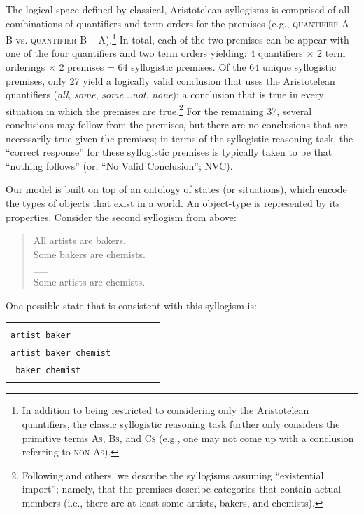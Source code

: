 \documentclass[floatsintext, doc]{apa6}
\newcommand{\mht}[1]{{\textcolor{Blue}{[mht: #1]}}}
\begin{document}
The logical space defined by classical, Aristotelean syllogisms is comprised of all combinations of quantifiers and term orders for the premises (e.g., \textsc{quantifier} \textsc{A} -- \textsc{B} vs. \textsc{quantifier} \textsc{B} -- \textsc{A}).\footnote{In addition to being restricted to considering only the Aristotelean quantifiers, the classic syllogistic reasoning task further only considers the primitive terms \textsc{As}, \textsc{Bs}, and \textsc{Cs} (e.g., one may not come up with a conclusion referring to \textsc{non-As}).}
In total, each of the two premises can be appear with one of the four quantifiers and two term orders yielding:  $4$ quantifiers  $\times$ 2 term orderings $\times$ 2 premises = 64 syllogistic premises.
Of the 64 unique syllogistic premises, only 27 yield a logically valid conclusion that uses the Aristotelean quantifiers (\emph{all}, \emph{some}, \emph{some...not}, \emph{none}): a conclusion that is true in every situation in which the premises are true.\footnote{Following  and others, we describe the syllogisms assuming ``existential import''; namely, that the premises describe categories that contain actual members (i.e., there are at least some artists, bakers, and chemists).}
For the remaining 37, several conclusions may follow from the premises, but there are no conclusions that are necessarily true given the premises; in terms of the syllogistic reasoning task, the ``correct response'' for these syllogistic premises is typically taken to be that ``nothing follows'' (or, ``No Valid Conclusion''; NVC). 



Our model is built on top of an ontology of states (or situations), which encode the types of objects that exist in a world. 
An object-type is represented by its properties.
Consider the second syllogism from above:

\begin{quote}
All artists are bakers. \\
Some bakers are chemists. \\
\_\_ \\
Some artists are chemists.
\end{quote}

One possible state that is consistent with this syllogism is:

\begin{tabularx}{.8\textwidth}{XXXXX}
& \\
\tt artist baker \\
\tt artist baker chemist \\
\tt \hspace{1.23cm} baker chemist 
& \\
& \\
\end{tabularx}
\end{document}
